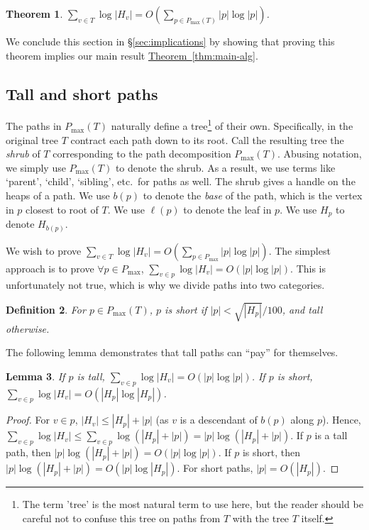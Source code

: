\documentclass[11pt]{article}
\newtheorem{theorem}{Theorem}[section]
\newtheorem{lemma}[theorem]{Lemma}
\newtheorem{definition}[theorem]{Definition}
\theoremstyle{definition}
\newcommand{\Sec}[1]{\hyperref[sec:#1]{\S\ref*{sec:#1}}} %
\newcommand{\Thm}[1]{\hyperref[thm:#1]{Theorem~\ref*{thm:#1}}} %
\newcommand{\pmax}{P_{\max}}
\begin{document}
\begin{theorem} \label{thm:runtime} $\sum_{v \in T} \log |H_v| = O(\sum_{p\in \pmax(T)} |p| \log |p|)$.
\end{theorem}

We conclude this section in \Sec{implications} by showing that proving this theorem implies our main result \Thm{main-alg}.



\subsection{Tall and short paths}
\label{sec:shrubs}

The paths in $\pmax(T)$ naturally define a tree\footnote{
The term 'tree' is the most natural term to use here, but the reader should be careful not to confuse this tree on paths from $T$ with the tree $T$ itself.
} of their own.  Specifically, in the original 
tree $T$ contract each path down to its root.  Call the resulting tree the \emph{shrub} of $T$ corresponding to 
the path decomposition $\pmax(T)$. Abusing notation, we simply use $\pmax(T)$ to denote the shrub.
As a result, we use terms like `parent', `child', `sibling', etc.\ for paths as well.
The shrub gives a handle on the heaps of a path.
We use $b(p)$ to denote the \emph{base} of the path, which is the vertex in $p$ closest
to root of $T$. We use $\ell(p)$ to denote the leaf in $p$.
We use $H_p$ to denote $H_{b(p)}$.

We wish to prove $\sum_{v\in T} \log |H_v| = O(\sum_{p\in \pmax} |p| \log |p|)$. 
The simplest approach is to prove $\forall p\in \pmax$, $\sum_{v\in p} \log |H_v|= O(|p|\log|p|)$.
This is unfortunately not true, which is why we divide paths into two categories.

\begin{definition}
 For $p\in \pmax(T)$, $p$ is \emph{short} if $|p| < \sqrt{|H_{p}|}/100$, and \emph{tall} otherwise.
\end{definition}

The following lemma demonstrates that tall paths can ``pay'' for themselves.

\begin{lemma}
\label{lem:pathBounds} If $p$ is tall, $\sum_{v\in p} \log |H_v| = O(|p| \log |p|)$.
If $p$ is short, $\sum_{v\in p} \log |H_v| = O(|H_p| \log |H_p|)$.
\end{lemma}
\begin{proof}
For $v \in p$, $|H_v|\leq |H_{p}| + |p|$ (as $v$ is a descendant of $b(p)$ along $p$).
Hence, $\sum_{v\in p} \log |H_v| \leq \sum_{v\in p} \log(|H_{p}| + |p|)  = |p| \log (|H_{p}| + |p|)$.
 If $p$ is a tall path, then $|p| \log (|H_{p}| + |p|) = O(|p| \log |p|)$. If $p$ is short, then 
 $|p| \log (|H_{p}| + |p|) = O(|p| \log |H_{p}| )$. For short paths, $|p| = O(|H_p|)$.
\end{proof}
\end{document}
